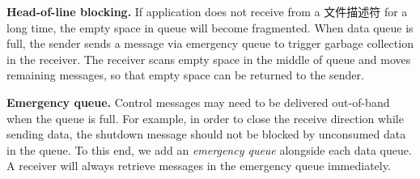 \textbf{Head-of-line blocking.}
If application does not receive from a 文件描述符 for a long time, the empty space in queue will become fragmented.
When data queue is full, the sender sends a message via emergency queue to trigger garbage collection in the receiver.
The receiver scans empty space in the middle of queue and moves remaining messages, so that empty space can be returned to the sender.

\textbf{Emergency queue.}
Control messages may need to be delivered out-of-band when the queue is full. For example, in order to close the receive direction while sending data, the shutdown message should not be blocked by unconsumed data in the queue. To this end, we add an \textit{emergency queue} alongside each data queue.
A receiver will always retrieve messages in the emergency queue immediately.
\fi

